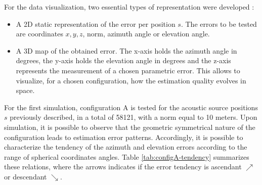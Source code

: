 For the data visualization, two essential types of representation were developed :

\begin{itemize}
	\item A 2D static representation of the error per position $s$. The errors to be tested are coordinates $x, y, z$, norm, azimuth angle or elevation angle.
	
	\item A 3D map of the obtained error. The x-axis holds the azimuth angle in degrees, the y-axis holds the elevation angle in degrees and the z-axis represents the measurement of a chosen parametric error. This allows to visualize, for a chosen configuration, how the estimation quality evolves in space.
	
\end{itemize}

For the first simulation, configuration A is tested for the acoustic source positions $s$  previously described, in a total of 58121, with a norm equal to 10 meters. Upon simulation, it is possible to observe that the geometric symmetrical nature of the configuration leads to estimation error patterns. Accordingly, it is possible to characterize the tendency of the azimuth and elevation errors according to the range of spherical coordinates angles. Table \ref{tab:configA-tendency} summarizes these relations, where the arrows indicates if the error tendency is ascendant $\nearrow$ or descendant $\searrow$.

\begin{table}[!htbp] %
	\begin{center}
		\caption{Azimuth and elevation errors slope tendency for configuration A}
		\label{tab:configA-tendency}
	\end{center}
\end{table}

